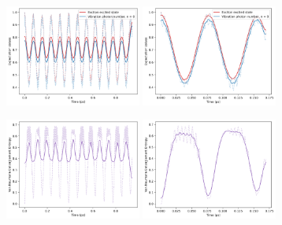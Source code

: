 \documentclass[11pt]{article}
\begin{document}
\begin{figure}[H]
    \centering

    \begin{subfigure}{\textwidth}
        \centering
        \includegraphics[width=0.49\textwidth]{Research Project/Code/results/ExVib/Closed/Envelope/pops_excited.png}
        \hfill
        \includegraphics[width=0.49\textwidth]{Research Project/Code/results/ExVib/Closed/Fast/pops_excited.png}
        \caption{}
        \label{fig:EVM_CQS_Pop_e0}
    \end{subfigure}

    \vspace{0.8em}

    \begin{subfigure}{\textwidth}
        \centering
        \includegraphics[width=0.49\textwidth]{Research Project/Code/results/ExVib/Closed/Envelope/vne.png}
        \hfill
        \includegraphics[width=0.49\textwidth]{Research Project/Code/results/ExVib/Closed/Fast/vne.png}
        \caption{}
        \label{fig:EVM_CQS_Ent_e0}
    \end{subfigure}


\end{figure}
\end{document}
